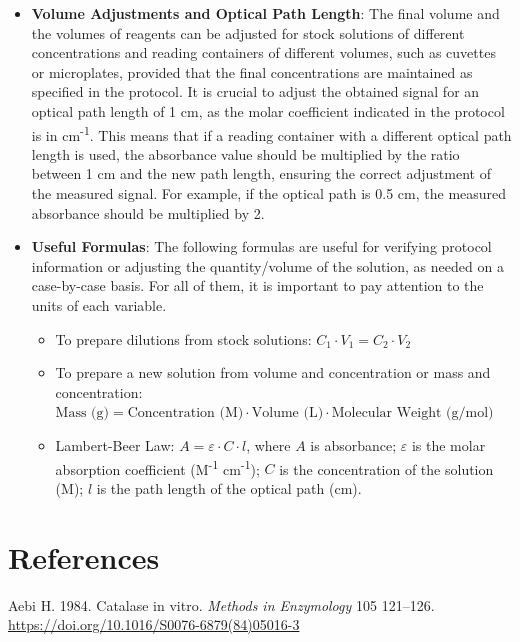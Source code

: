 \documentclass[
  9pt,
  american,
  a5paper,
  extrafontsizes,onecolumn,openright
  ]{memoir}
\providecommand{\tightlist}{%
  \setlength{\itemsep}{0pt}\setlength{\parskip}{0pt}}
\begin{document}
\begin{itemize}
\item
  \textbf{Volume Adjustments and Optical Path Length}: The final volume and the volumes of reagents can be adjusted for stock solutions of different concentrations and reading containers of different volumes, such as cuvettes or microplates, provided that the final concentrations are maintained as specified in the protocol. It is crucial to adjust the obtained signal for an optical path length of 1 cm, as the molar coefficient indicated in the protocol is in cm\textsuperscript{-1}. This means that if a reading container with a different optical path length is used, the absorbance value should be multiplied by the ratio between 1 cm and the new path length, ensuring the correct adjustment of the measured signal. For example, if the optical path is 0.5 cm, the measured absorbance should be multiplied by 2.
\item
  \textbf{Useful Formulas}: The following formulas are useful for verifying protocol information or adjusting the quantity/volume of the solution, as needed on a case-by-case basis. For all of them, it is important to pay attention to the units of each variable.

  \begin{itemize}
  \tightlist
  \item
    To prepare dilutions from stock solutions: \(C_1 \cdot V_1 = C_2 \cdot V_2\)
  \item
    To prepare a new solution from volume and concentration or mass and concentration: \(\text{Mass (g)} = \text{Concentration (M)} \cdot \text{Volume (L)} \cdot \text{Molecular Weight (g/mol)}\)
  \item
    Lambert-Beer Law: \(A = \varepsilon \cdot C \cdot l\), where \(A\) is absorbance; \(\varepsilon\) is the molar absorption coefficient (M\textsuperscript{-1} cm\textsuperscript{-1}); \(C\) is the concentration of the solution (M); \(l\) is the path length of the optical path (cm).
  \end{itemize}
\end{itemize}

\section{References}\label{references}

Aebi H. 1984. Catalase in vitro. \emph{Methods in Enzymology} 105 121--126. \url{https://doi.org/10.1016/S0076-6879(84)05016-3}
\end{document}
